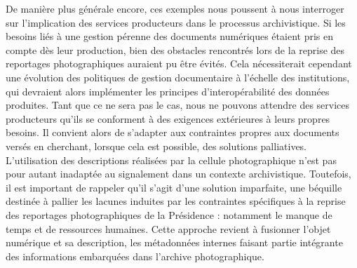 De manière plus générale encore, ces exemples nous poussent à nous interroger sur l'implication des services producteurs dans le processus archivistique. Si les besoins liés à une gestion pérenne des documents numériques étaient pris en compte dès leur production, bien des obstacles rencontrés lors de la reprise des reportages photographiques auraient pu être évités. Cela nécessiterait cependant une évolution des politiques de gestion documentaire à l'échelle des institutions, qui devraient alors implémenter les principes d'interopérabilité des données produites. Tant que ce ne sera pas le cas, nous ne pouvons attendre des services producteurs qu'ils se conforment à des exigences extérieures à leurs propres besoins. Il convient alors de s'adapter aux contraintes propres aux documents versés en cherchant, lorsque cela est possible, des solutions palliatives. L'utilisation des descriptions réalisées par la cellule photographique n'est pas pour autant inadaptée au signalement dans un contexte archivistique. Toutefois, il est important de rappeler qu'il s'agit d'une solution imparfaite, une béquille destinée à pallier les lacunes induites par les contraintes spécifiques à la reprise des reportages photographiques de la Présidence : notamment le manque de temps et de ressources humaines. Cette approche revient à fusionner l'objet numérique et sa description, les métadonnées internes faisant partie intégrante des informations embarquées dans l'archive photographique.


